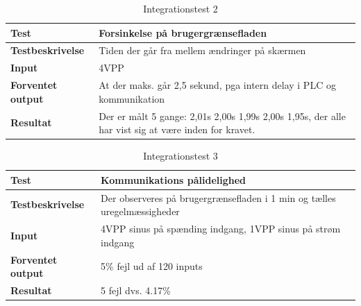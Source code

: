 \begin{table}
	\begin{tabular}{ | m{} | m{}|} 
		\hline
		\textbf{Test}					&Forsinkelse på brugergrænsefladen \\ \hline
		\textbf{Testbeskrivelse}		&Tiden der går fra mellem ændringer på skærmen \\ \hline
		\textbf{Input}					&4VPP \\ \hline
		\textbf{Forventet output}		&At der maks. går 2,5 sekund, pga intern delay i PLC og kommunikation \\ \hline
		\textbf{Resultat}				&Der er målt 5 gange: 2,01s 2,00s 1,99s 2,00s 1,95s, der alle har vist sig at være inden for kravet.   \\ \hline
	\end{tabular}
	\caption{Integrationstest 2} 
\label{tab:int test 2} 
\end{table}


\begin{table}
	\begin{tabular}{ | m{} | m{}|} 
		\hline
		\textbf{Test}					&Kommunikations pålidelighed \\ \hline
		\textbf{Testbeskrivelse}		&Der observeres på brugergrænsefladen i 1 min og tælles uregelmæssigheder \\ \hline
		\textbf{Input}					&4VPP sinus på spænding indgang, 1VPP sinus på strøm indgang\\ \hline
		\textbf{Forventet output}		&5\% fejl ud af 120 inputs \\ \hline
		\textbf{Resultat}				&5 fejl dvs. 4.17\%  \\ \hline
	\end{tabular}
	\caption{Integrationstest 3} 
\label{tab:int test 3} 
\end{table}
